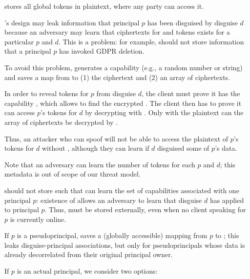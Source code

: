 \sys stores all global  tokens in plaintext, where any party can access it.

\sys's design may leak information that principal $p$ has been disguised by disguise
$d$ because an adversary may learn that ciphertexts for  and  tokens exists for a particular $p$ and $d$.
This is a problem: for example, \sys should not store information that a principal $p$ has
invoked GDPR deletion.

To avoid this problem, \sys generates a capability  (e.g., a random number or string)
and saves a map from  to (1) the  ciphertext and (2) an array of 
ciphertexts.

In order to reveal tokens for $p$ from disguise $d$, the client must prove it has the capability
, which allows \sys to find the encrypted . The client then has to prove it can
access $p$'s tokens for $d$ by decrypting  with .  Only with the
plaintext  can the array of  ciphertexts be decrypted by \sys.

Thus, an attacker who can spoof  will not be able to access the plaintext of $p$'s tokens for $d$ without
, although they can learn if $d$ disguised some of $p$'s data.

Note that an adversary can learn the number of  tokens for each $p$ and $d$; this
metadata is out of scope of our threat model.

\sys should not store  such that \sys can learn the
set of capabilities associated with one principal $p$: existence of  allows an adversary to
learn that disguise $d$ has applied to principal $p$. Thus,  must be stored externally,
even when no client speaking for $p$ is currently online.

If $p$ is a pseudoprincipal, \sys saves a (globally accessible) mapping from $p$ to ; this leaks disguise-principal associations, but only for pseudoprincipals whose data is already decorrelated from their original principal owner.

If $p$ is an actual principal, we consider two options: 

